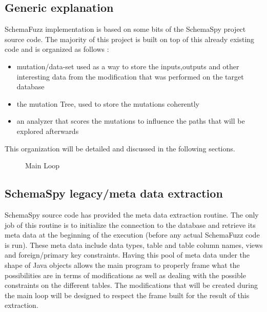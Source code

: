 \documentclass{article}
\begin{document}
\begin{empfile}
		\subsection{Generic explanation}
SchemaFuzz implementation is based on some bits of the SchemaSpy project source code.
The majority of this project is built on top of this already existing code and is organized as follows :
		\begin{itemize}
		\item{mutation/data-set used as a way to store the inputs,outputs and other interesting data from the modification that was performed on the target database}
		\item{the mutation Tree, used to store the mutations coherently}
		\item{an analyzer that scores the mutations to influence the paths that will be explored afterwards}
		\end{itemize}
This organization will be detailed and discussed in the following sections.

		 \clearpage
\begin{figure} [h!]
\centering

\caption{Main Loop}
\end{figure}
		 \clearpage		 
		 
		\subsection{SchemaSpy legacy/meta data extraction}
SchemaSpy source code has provided the meta data extraction routine. The only job of this routine is to initialize the connection to the database and retrieve its meta data at the   beginning of the execution (before any actual SchemaFuzz code is run). These meta data include data types, table and table column names, views and foreign/primary key constraints. Having this pool of meta data under the shape of Java objects allows the main program to properly frame what the possibilities are in terms of modifications as well as dealing with the possible constraints on the different tables. The modifications that will be created during the main loop will be designed to respect the frame built for the result of this extraction.

\clearpage


\end{empfile}
\end{document}
